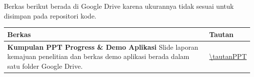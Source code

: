 \vspace{3ex}

\noindent
Berkas berikut berada di Google Drive karena ukurannya tidak sesuai untuk
disimpan pada repositori kode.

\vspace{1ex}
\renewcommand{\arraystretch}{1.6}
\begin{tabular}{@{}p{}p{}@{}}
\toprule
\textbf{Berkas} & \textbf{Tautan} \\
\midrule

\textbf{Kumpulan PPT Progress \& Demo Aplikasi} \newline
{\footnotesize Slide laporan kemajuan penelitian dan berkas demo aplikasi
berada dalam satu folder Google Drive.} &
\url{\tautanPPT} \\

\bottomrule
\end{tabular}

\vspace{3ex}

